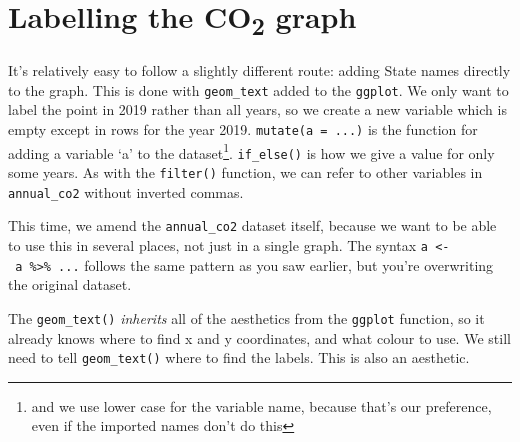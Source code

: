 \documentclass[
]{book}
\begin{document}
\hypertarget{labelling-the-co2-graph}{%
\section{\texorpdfstring{Labelling the CO\textsubscript{2} graph}{Labelling the CO2 graph}}\label{labelling-the-co2-graph}}

It's relatively easy to follow a slightly different route: adding State names directly to the graph. This is done with \texttt{geom\_text} added to the \texttt{ggplot}. We only want to label the point in 2019 rather than all years, so we create a new variable which is empty except in rows for the year 2019. \texttt{mutate(a\ =\ ...)} is the function for adding a variable `a' to the dataset\footnote{and we use lower case for the variable name, because that's our preference, even if the imported names don't do this}. \texttt{if\_else()} is how we give a value for only some years. As with the \texttt{filter()} function, we can refer to other variables in \texttt{annual\_co2} without inverted commas.

This time, we amend the \texttt{annual\_co2} dataset itself, because we want to be able to use this in several places, not just in a single graph. The syntax \texttt{a\ \textless{}-\ a\ \%\textgreater{}\%\ ...} follows the same pattern as you saw earlier, but you're overwriting the original dataset.

The \texttt{geom\_text()} \emph{inherits} all of the aesthetics from the \texttt{ggplot} function, so it already knows where to find x and y coordinates, and what colour to use. We still need to tell \texttt{geom\_text()} where to find the labels. This is also an aesthetic.
\end{document}
